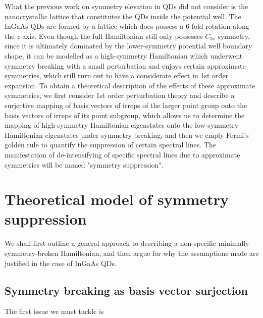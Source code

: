 \documentclass[12pt]{article}
\begin{document}
	What the previous work on symmetry elevation in QDs did not consider is the nanocrystallic lattice that constitutes the QDs inside the potential well. The InGaAs QDs are formed by a lattice which does possess a 6-fold rotation along the $z$-axis. Even though the full Hamiltonian still only possesses $C_{3v}$ symmetry, since it is ultimately dominated by the lower-symmetry potential well boundary shape, it can be modelled as a high-symmetry Hamiltonian which underwent symmetry breaking with a small perturbation and enjoys certain approximate symmetries, which still turn out to have a considerate effect in 1st order expansion. To obtain a theoretical description of the effects of these approximate symmetries, we first consider 1st order perturbation theory and describe a surjective mapping of basis vectors of irreps of the larger point group onto the basis vectors of irreps of its point subgroup, which allows us to determine the mapping of high-symmetry Hamiltonian eigenstates onto the low-symmetry Hamiltonian eigenstates under symmetry breaking, and then we emply Fermi's golden rule to quantify the suppression of certain spectral lines. The manifestation of de-intensifying of specific spectral lines due to approximate symmetries will be named "symmetry suppression".
	
	\section{Theoretical model of symmetry suppression}
	We shall first outline a general approach to describing a non-specific minimally symmetry-broken Hamiltonian, and then argue for why the assumptions made are justified in the case of InGaAs QDs. 
	\subsection{Symmetry breaking as basis vector surjection}
	
	The first issue we must tackle is 
	
\end{document}
